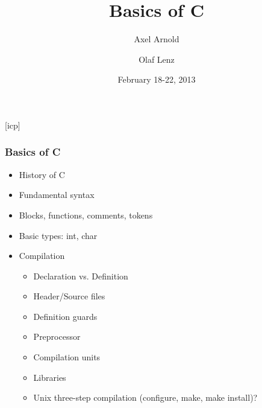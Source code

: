 \documentclass{slides}
\begin{document}
\graphicspath{{figures/}}

\title[Basics of C]{\Large Basics of C}

\author[A. Arnold and O. Lenz]{Axel Arnold \and Olaf Lenz} 
\date{February 18-22, 2013}

\begin{frame}
  \titlepage
\end {frame}
[icp]

\begin{frame}
  \frametitle{Basics of C}
  \begin{itemize}
  \item History of C
  \item Fundamental syntax
  \item Blocks, functions, comments, tokens
  \item Basic types: int, char
  \item Compilation
    \begin{itemize}
    \item Declaration vs. Definition
    \item Header/Source files
    \item Definition guards
    \item Preprocessor
    \item Compilation units
    \item Libraries
    \item Unix three-step compilation (configure, make, make install)?
    \end{itemize}
  \end{itemize}
\end{frame}
\end{document}
